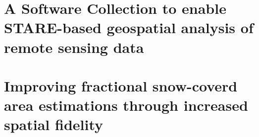 \documentclass[oneside,11pt,final]{sty/ucthesis-CA2012}
\begin{document}
\begin{mainmatter}
\chapter{A Software Collection to enable STARE-based geospatial analysis of remote sensing data}
\label{Chapter_Software}
\glsresetall


\chapter{Improving fractional snow-coverd area estimations through increased spatial fidelity}
\label{chapter_3}
\glsresetall





\end{mainmatter}

\ssp
%
%
\printbibliography
\end{document}
